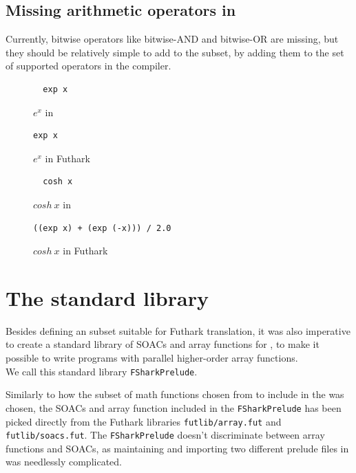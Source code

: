 \subsection{Missing arithmetic operators in \fshark{}}
Currently, bitwise operators like bitwise-AND and bitwise-OR are missing, but
they should be relatively simple to add to the \fshark{} subset, by adding them
to the set of supported operators in the \fshark{} compiler.


\clearpage

\begin{figure}[H]
  \centering
\begin{verbatim}
  exp x
\end{verbatim}
  \caption{$e^x$ in \fsharp{}}
  \label{fig:fsharkexp}
\end{figure}

\begin{figure}[H]
  \centering
\begin{lstlisting}[language=Futhark]
  exp x
\end{lstlisting}
  \caption{$e^x$ in Futhark}
  \label{fig:futharkexp}
\end{figure}

\begin{figure}[H]
  \centering
\begin{verbatim}
  cosh x
\end{verbatim}
  \caption{$cosh~ x$ in \fsharp{}}
  \label{fig:fsharkcosh}
\end{figure}
\begin{figure}[H]
  \centering
\begin{lstlisting}[language=Futhark]
  ((exp x) + (exp (-x))) / 2.0
\end{lstlisting}
  \caption{$cosh~x$ in Futhark}
  \label{fig:futharkcosh}
\end{figure}

\clearpage
\section{The \fshark{} standard library}
Besides defining an \fsharp{} subset suitable for Futhark translation, it was
also imperative to create a standard library of SOACs and array functions for \fshark{},
to make it possible to write programs with parallel higher-order array
functions.
\\
We call this standard library \texttt{FSharkPrelude}.

Similarly to how the subset of math functions chosen from \fsharp{} to include in
the \fshark{} was chosen, the SOACs and array function included in the
\texttt{FSharkPrelude} has been picked directly from the Futhark libraries
\texttt{futlib/array.fut} and \texttt{futlib/soacs.fut}. The \texttt{FSharkPrelude} doesn't
discriminate between array functions and SOACs, as maintaining and importing two
different prelude files in \fshark{} was needlessly complicated.

